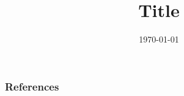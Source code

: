 \documentclass{beamer}
\title[latent]{Title}
\author[us]{\today}
\institute[Harvard SEAS]{ 
{ }


}
\date{}
\begin{document}
\begin{frame}
  \titlepage
\end{frame}

\begin{frame}
  \tableofcontents[hideallsubsections]
\end{frame}





\begin{frame}[allowframebreaks]
        \frametitle{References}
        {\tiny
        \printbibliography}
\end{frame}
\end{document}
